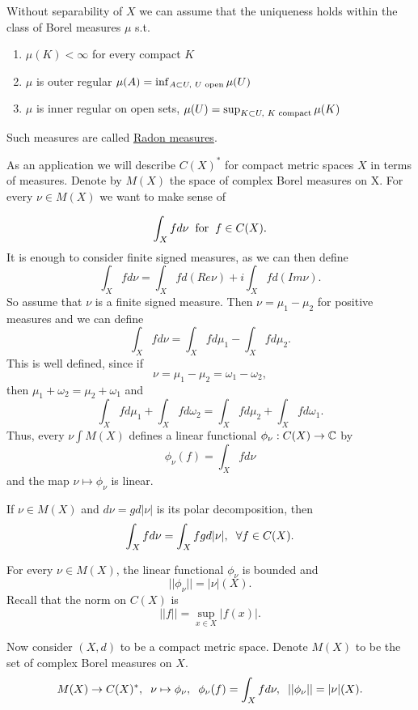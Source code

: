\begin{remark}
    Without separability of $X$ we can assume that the uniqueness holds within the class of Borel measures $\mu$ s.t.
    \begin{enumerate}
        \item $\mu(K)<\infty$ for every compact $K$
        \item $\mu$ is outer regular $\mu(A) = \inf_{A\subset U,\hspace{1mm}U\text{ open}}\mu(U)$
        \item $\mu$ is inner regular on open sets, $\mu(U) = \sup_{K\subset U,\hspace{1mm}K\text{ compact}}\mu(K)$
    \end{enumerate} 
    Such measures are called \underline{Radon measures}.
\end{remark}

As an application we will describe $C(X)^*$ for compact metric spaces $X$ in terms of measures. Denote by $M(X)$ the space of complex Borel measures on X.
For every $\nu\in M(X)$ we want to make sense of

\[\int_X fd\nu \hspace{2mm}\text{for}\hspace{2mm} f\in C(X).\]
It is enough to consider finite signed measures, as we can then define 
\[ \int_X f d\nu = \int_X fd(Re\nu) +i\int_X fd(Im\nu).\]
So assume that $\nu$ is a finite signed measure. Then $\nu = \mu_1-\mu_2$ for positive measures and we can define 
\[\int_X fd\nu = \int_X fd\mu_1 - \int_X fd\mu_2.\]
This is well defined, since if \[\nu = \mu_1-\mu_2 = \omega_1-\omega_2,\]
then $\mu_1+\omega_2 = \mu_2+\omega_1$ and 
\[\int_X fd\mu_1 + \int_X fd\omega_2 = \int_X fd\mu_2 + \int_Xfd\omega_1.\]
Thus, every $\nu\int M(X)$ defines a linear functional $\phi_\nu:C(X)\rightarrow \mathbb{C}$ by \[ \phi_\nu(f) = \int_X fd\nu\] and the map 
$\nu\mapsto \phi_\nu$ is linear. 

\begin{lemma}
    If $\nu\in M(X)$ and $d\nu = gd|\nu|$ is its polar decomposition, then 
    \[\int_X fd\nu = \int_X fgd|\nu|,\hspace{2mm} \forall f\in C(X).\]
\end{lemma}


\begin{lemma}
    For every $\nu\in M(X)$, the linear functional $\phi_\nu$ is bounded and \[||\phi_\nu|| = |\nu|(X).\]
    Recall that the norm on $C(X)$ is \[||f||=\sup_{x\in X}|f(x)|.\]
\end{lemma}


Now consider $(X,d)$ to be a compact metric space. Denote $M(X)$ to be the set of complex Borel measures on $X$.
\[M(X)\rightarrow C(X)^*,\hspace{2mm} \nu\mapsto \phi_\nu,\hspace{2mm} \phi_\nu(f)=\int_X fd\nu,\hspace{2mm} ||\phi_\nu|| = |\nu|(X).\]


